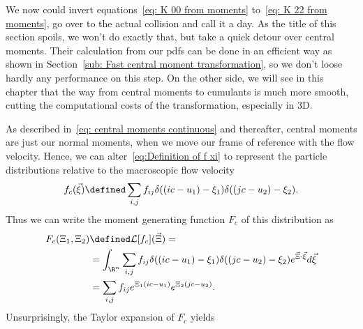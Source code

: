 We now could invert equations~\eqref{eq: K 00 from moments} to~\eqref{eq: K 22 from moments}, go over to the actual collision and call it a day.
As the title of this section spoils, we won't do exactly that, but take a quick detour over central moments.
Their calculation from our \glspl{pdf} can be done in an efficient way as shown in Section~\ref{sub: Fast central moment transformation},
so we don't loose hardly any performance on this step.
On the other side, we will see in this chapter that the way from central moments to cumulants is much more smooth, cutting the computational costs of the transformation, especially in 3D.

As described in~\eqref{eq: central moments continuous} and thereafter, central moments are just our normal moments, when we move our frame of reference with the flow velocity.
Hence, we can alter~\eqref{eq:Definition of f xi} to represent the particle distributions relative to the macroscopic flow velocity
\begin{equation}
  \label{eq:Definition of f c xi}
  f_c(\vec{\xi}) \defined \sum_{i,j} f_{ij}\delta((ic - u_1) - \xi_1)\delta((jc - u_2) -\xi_2) .
\end{equation}
Thus we can write the moment generating function $F_c$ of this distribution as
\begin{equation}
  \label{eq: Definition of centralized F}
  \begin{aligned}
    F_c(\Xi_1, \Xi_2) & \defined \mathcal{L}[f_c](\vec{\Xi}) =  \\
    & = \int_{\R^n} \sum_{i,j} f_{ij}\delta((ic - u_1) - \xi_1)\delta((jc - u_2) -\xi_2) e^{\vec{\Xi} \cdot \vec{\xi}}d\vec{\xi} \\
    & =\sum_{i,j} f_{ij} e^{\Xi_1(ic - u_1)} e^{\Xi_2(jc - u_2)}.
  \end{aligned}
\end{equation}
Unsurprisingly, the Taylor expansion of $F_c$ yields
